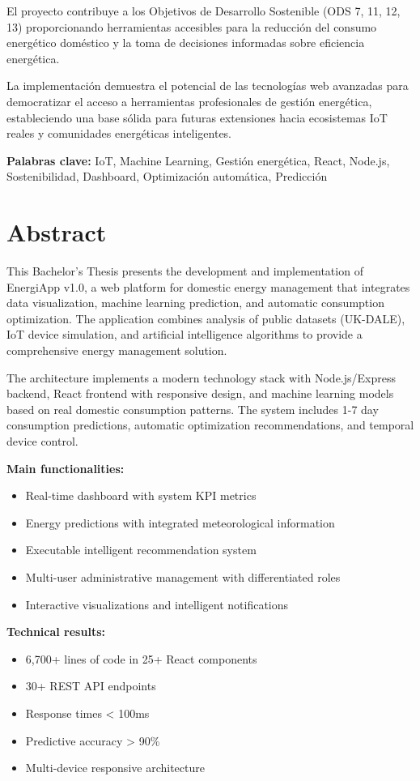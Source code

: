 \documentclass[12pt,a4paper,spanish]{book}
\begin{document}
El proyecto contribuye a los Objetivos de Desarrollo Sostenible (ODS 7, 11, 12, 13) proporcionando herramientas accesibles para la reducción del consumo energético doméstico y la toma de decisiones informadas sobre eficiencia energética.

La implementación demuestra el potencial de las tecnologías web avanzadas para democratizar el acceso a herramientas profesionales de gestión energética, estableciendo una base sólida para futuras extensiones hacia ecosistemas IoT reales y comunidades energéticas inteligentes.

\textbf{Palabras clave:} IoT, Machine Learning, Gestión energética, React, Node.js, Sostenibilidad, Dashboard, Optimización automática, Predicción

\chapter*{Abstract}

This Bachelor's Thesis presents the development and implementation of EnergiApp v1.0, a web platform for domestic energy management that integrates data visualization, machine learning prediction, and automatic consumption optimization. The application combines analysis of public datasets (UK-DALE), IoT device simulation, and artificial intelligence algorithms to provide a comprehensive energy management solution.

The architecture implements a modern technology stack with Node.js/Express backend, React frontend with responsive design, and machine learning models based on real domestic consumption patterns. The system includes 1-7 day consumption predictions, automatic optimization recommendations, and temporal device control.

\textbf{Main functionalities:}
\begin{itemize}
    \item Real-time dashboard with system KPI metrics
    \item Energy predictions with integrated meteorological information
    \item Executable intelligent recommendation system
    \item Multi-user administrative management with differentiated roles
    \item Interactive visualizations and intelligent notifications
\end{itemize}

\textbf{Technical results:}
\begin{itemize}
    \item 6,700+ lines of code in 25+ React components
    \item 30+ REST API endpoints
    \item Response times < 100ms
    \item Predictive accuracy > 90\%
    \item Multi-device responsive architecture
\end{itemize}
\end{document}
